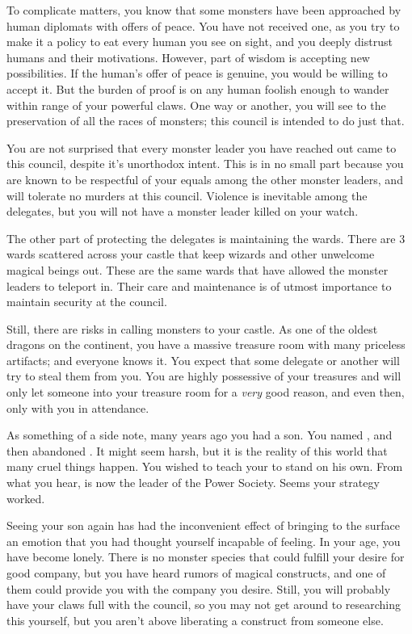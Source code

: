 \documentclass[char]{guildcamp2}
\begin{document}
To complicate matters, you know that some monsters have been approached by human diplomats with offers of peace. You have not received one, as you try to make it a policy to eat every human you see on sight, and you deeply distrust humans and their motivations. However, part of wisdom is accepting new possibilities. If the human's offer of peace is genuine, you would be willing to accept it. But the burden of proof is on any human foolish enough to wander within range of your powerful claws. One way or another, you will see to the preservation of all the races of monsters; this council is intended to do just that.

You are not surprised that every monster leader you have reached out came to this council, despite it's unorthodox intent. This is in no small part because you are known to be respectful of your equals among the other monster leaders, and will tolerate no murders at this council. Violence is inevitable among the delegates, but you will not have a monster leader killed on your watch. 

The other part of protecting the delegates is maintaining the wards. There are 3 wards scattered across your castle that keep wizards and other unwelcome magical beings out. These are the same wards that have allowed the monster leaders to teleport in. Their care and maintenance is of utmost importance to maintain security at the council.

Still, there are risks in calling monsters to your castle. As one of the oldest dragons on the continent, you have a massive treasure room with many priceless artifacts; and everyone knows it. You expect that some delegate or another will try to steal them from you. You are highly possessive of your treasures and will only let someone into your treasure room for a \emph{very} good reason, and even then, only with you in attendance.
	
As something of a side note, many years ago you had a son. You named \cRed{\them} \cRed{}, and then abandoned \cRed{\them}. It might seem harsh, but it is the reality of this world that many cruel things happen. You wished to teach your \cRed{\offspring} to stand on his own. From what you hear, \cRed{\they} is now the leader of the Power Society. Seems your strategy worked.

Seeing your son again has had the inconvenient effect of bringing to the surface an emotion that you had thought yourself incapable of feeling. In your age, you have become lonely. There is no monster species that could fulfill your desire for good company, but you have heard rumors of magical constructs, and one of them could provide you with the company you desire. Still, you will probably have your claws full with the council, so you may not get around to researching this yourself, but you aren't above liberating a construct from someone else.
	
\end{document}
